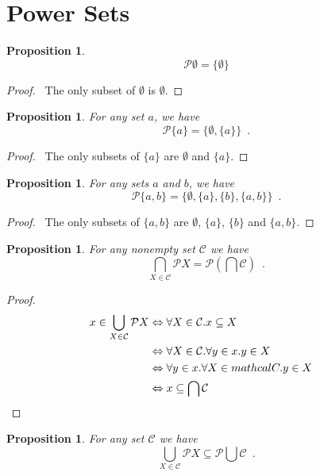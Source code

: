 \documentclass{report}
\let\qed\relax
\newtheorem{prop}[ax]{Proposition}
\theoremstyle{definition}
\begin{document}
\section{Power Sets}

\begin{prop}
\[ \mathcal{P} \emptyset = \{ \emptyset \} \]
\end{prop}

\begin{proof}
\pf\ The only subset of $\emptyset$ is $\emptyset$. \qed
\end{proof}

\begin{prop}
For any set $a$, we have
\[ \mathcal{P} \{ a \} = \{ \emptyset, \{ a \} \} \enspace . \]
\end{prop}

\begin{proof}
\pf\ The only subsets of $\{a\}$ are $\emptyset$ and $\{a\}$. \qed
\end{proof}

\begin{prop}
For any sets $a$ and $b$, we have
\[ \mathcal{P} \{ a,b \} = \{ \emptyset, \{a\}, \{b\}, \{a,b\} \} \enspace . \]
\end{prop}

\begin{proof}
\pf\ The only subsets of $\{a,b\}$ are $\emptyset$, $\{a\}$, $\{b\}$ and $\{a,b\}$. \qed
\end{proof}

\begin{prop}
For any nonempty set $\mathcal{C}$ we have
\[ \bigcap_{X \in \mathcal{C}} \mathcal{P} X = \mathcal{P} \left( \bigcap \mathcal{C} \right) \enspace . \]
\end{prop}

\begin{proof}
\pf
\begin{align*}
x \in \bigcup_{X \in \mathcal{C}} \mathcal{P} X
& \Leftrightarrow \forall X \in \mathcal{C}. x \subseteq X \\
& \Leftrightarrow \forall X \in \mathcal{C}. \forall y \in x. y \in X \\
& \Leftrightarrow \forall y \in x. \forall X \in mathcal{C}. y \in X \\
& \Leftrightarrow x \subseteq \bigcap \mathcal{C} & \qed
\end{align*}
\end{proof}

\begin{prop}
For any set $\mathcal{C}$ we have
\[ \bigcup_{X \in \mathcal{C}} \mathcal{P} X \subseteq \mathcal{P} \bigcup \mathcal{C} \enspace . \]
\end{prop}
\end{document}
